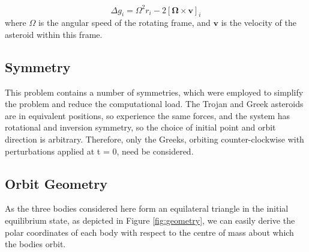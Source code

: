 \documentclass[11pt, a4paper,twocolumn]{article} %
\begin{document}
\begin{equation}
\Delta g_{i} = \Omega^{2} r_{i} - 2[\bm{\Omega} \times \textbf{v}]_{i}
\end{equation}
where $\Omega$ is the angular speed of the rotating frame, and $\textbf{v}$ is the velocity of the asteroid within this frame. 


\subsection{Symmetry} \label{symmetry}
This problem contains a number of symmetries, which were employed to simplify the problem and reduce the computational load. The Trojan and Greek asteroids are in equivalent positions, so experience the same forces, and the system has rotational and inversion symmetry, so the choice of initial point and orbit direction is arbitrary. Therefore, only the Greeks, orbiting counter-clockwise with perturbations applied at t = 0, need be considered.

\subsection{Orbit Geometry}
As the three bodies considered here form an equilateral triangle in the initial equilibrium state, as depicted in Figure \ref{fig:geometry}, we can easily derive the polar coordinates of each body with respect to the centre of mass about which the bodies orbit.
\end{document}
